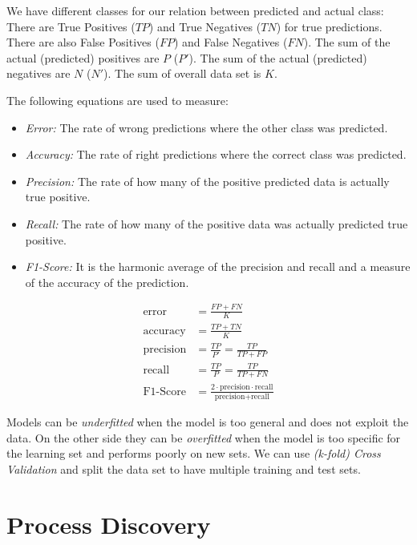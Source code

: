 \documentclass[english]{panikzettel}
\begin{document}
We have different classes for our relation between predicted and actual class: There are True Positives ($TP$) and True Negatives ($TN$) for true predictions. There are also False Positives ($FP$) and False Negatives ($FN$). The sum of the actual (predicted) positives are $P$ ($P'$). The sum of the actual (predicted) negatives are $N$ ($N'$). The sum of overall data set is $K$.

\begin{halfboxl}
The following equations are used to measure:
\begin{itemize}
    \item \emph{Error:} The rate of wrong predictions where the other class was predicted.
    \item \emph{Accuracy:} The rate of right predictions where the correct class was predicted.
    \item \emph{Precision:} The rate of how many of the positive predicted data is actually true positive.
    \item \emph{Recall:} The rate of how many of the positive data was actually predicted true positive.
    \item \emph{F1-Score:} It is the harmonic average of the precision and recall and a measure of the accuracy of the prediction.
\end{itemize}

\end{halfboxl}%
\begin{halfboxr}
\vspace{-\baselineskip}
\begin{align*}
\text{error}&=\frac{FP+FN}{K}\\
\text{accuracy}&=\frac{TP+TN}{K}\\
\text{precision}&=\frac{TP}{P'}=\frac{TP}{TP+FP}\\
\text{recall}&=\frac{TP}{P}=\frac{TP}{TP+FN}\\
\text{F1-Score}&=\frac{2 \cdot \text{precision} \cdot \text{recall}}{\text{precision} + \text{recall}}
\end{align*}
\end{halfboxr}

Models can be \emph{underfitted} when the model is too general and does not exploit the data. On the other side they can be \emph{overfitted} when the model is too specific for the learning set and performs poorly on new sets. We can use \emph{(k-fold) Cross Validation} and split the data set to have multiple training and test sets.

\section{Process Discovery}
\end{document}

